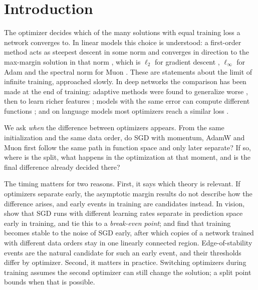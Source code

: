 \documentclass[10pt]{article}
\begin{document}
\section{Introduction}
\label{sec:intro}

The optimizer decides which of the many solutions with equal training loss a network converges to. In
linear models this choice is understood: a first-order method acts as steepest descent in some norm and
converges in direction to the max-margin solution in that norm \citep{gunasekar2018geometry}, which is
$\ell_2$ for gradient descent \citep{soudry2018separable}, $\ell_\infty$ for Adam
\citep{zhang2024adam,xie2024adamw} and the spectral norm for Muon \citep{fan2025spectral}. These are
statements about the limit of infinite training, approached slowly. In deep networks the comparison has
been made at the end of training: adaptive methods were found to generalize worse
\citep{wilson2017marginal}, then to learn richer features \citep{vasudeva2025rich}; models with the same
error can compute different functions \citep{cortesi2026same}; and on language models most optimizers
reach a similar loss \citep{zhao2025deconstructing}.

We ask \emph{when} the difference between optimizers appears. From the same initialization and the same
data order, do SGD with momentum, AdamW and Muon first follow the same path in function space and only
later separate? If so, where is the split, what happens in the optimization at that moment, and is the
final difference already decided there?

The timing matters for two reasons. First, it says which theory is relevant. If optimizers separate early,
the asymptotic margin results do not describe how the difference arises, and early events in training are
candidates instead. In vision, \citet{jastrzebski2020breakeven} show that SGD runs with different learning
rates separate in prediction space early in training, and tie this to a \emph{break-even point}; and
\citet{frankle2020lmc} find that training becomes stable to the noise of SGD early, after which copies of a
network trained with different data orders stay in one linearly connected region. Edge-of-stability events
\citep{cohen2021eos,cohen2022adaptive,andreyev2024eoss} are the natural candidate for such an early event,
and their thresholds differ by optimizer. Second, it matters in practice. Switching optimizers during
training \citep{keskar2017swats} assumes the second optimizer can still change the solution; a split point
bounds when that is possible.
\end{document}
